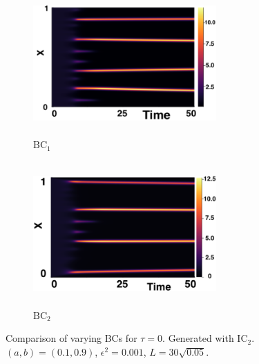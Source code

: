 \begin{figure}[H]
    \centering
    \begin{subfigure}[b]{0.45\textwidth}
        \centering
        \includegraphics[width=7cm,height=5.5cm]{ic20.png}
        \caption{$\text{BC}_1$}
        \label{}
    \end{subfigure}
    \hfill
    \begin{subfigure}[b]{0.45\textwidth}
        \centering
        \includegraphics[width=7cm,height=5.5cm]{bc0.png}
        \caption{$\text{BC}_2$}
        \label{}
    \end{subfigure}
    \caption{Comparison of varying BCs for $\tau=0$. Generated with $\text{IC}_2$. $(a,b)=(0.1,0.9)$, $\epsilon^2=0.001$, $L=30\sqrt{0.05}$.}
    \label{fig:bctau1}
\end{figure}

